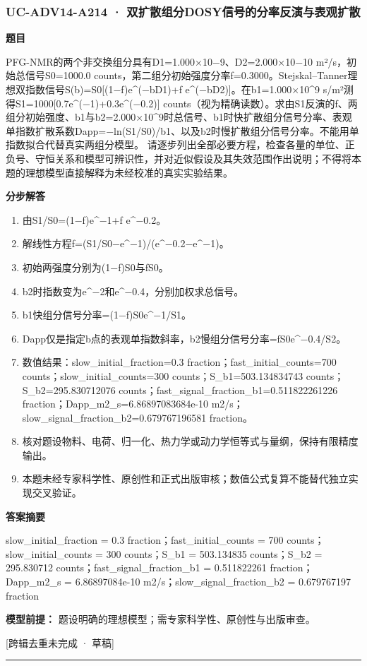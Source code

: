 \documentclass[UTF8,11pt,a4paper]{ctexart}
\begin{document}
\subsubsection*{UC-ADV14-A214 · 双扩散组分DOSY信号的分率反演与表观扩散}
\noindent\textbf{题目}\par
PFG-NMR的两个非交换组分具有D1=1.000×10−9、D2=2.000×10−10 m²/s，初始总信号S0=1000.0 counts，第二组分初始强度分率f=0.3000。Stejskal–Tanner理想双指数信号S(b)=S0[(1−f)e\textasciicircum{}(−bD1)+f e\textasciicircum{}(−bD2)]。在b1=1.000×10\textasciicircum{}9 s/m²测得S1=1000[0.7e\textasciicircum{}(−1)+0.3e\textasciicircum{}(−0.2)] counts（视为精确读数）。求由S1反演的f、两组分初始强度、b1与b2=2.000×10\textasciicircum{}9时总信号、b1时快扩散组分信号分率、表观单指数扩散系数Dapp=−ln(S1/S0)/b1、以及b2时慢扩散组分信号分率。不能用单指数拟合代替真实两组分模型。 请逐步列出全部必要方程，检查各量的单位、正负号、守恒关系和模型可辨识性，并对近似假设及其失效范围作出说明；不得将本题的理想模型直接解释为未经校准的真实实验结果。\par
\medskip\noindent\textbf{分步解答}
\begin{enumerate}
\item 由S1/S0=(1−f)e\textasciicircum{}−1+f e\textasciicircum{}−0.2。
\item 解线性方程f=(S1/S0−e\textasciicircum{}−1)/(e\textasciicircum{}−0.2−e\textasciicircum{}−1)。
\item 初始两强度分别为(1−f)S0与fS0。
\item b2时指数变为e\textasciicircum{}−2和e\textasciicircum{}−0.4，分别加权求总信号。
\item b1快组分信号分率=(1−f)S0e\textasciicircum{}−1/S1。
\item Dapp仅是指定b点的表观单指数斜率，b2慢组分信号分率=fS0e\textasciicircum{}−0.4/S2。
\item 数值结果：slow\_initial\_fraction=0.3 fraction；fast\_initial\_counts=700 counts；slow\_initial\_counts=300 counts；S\_b1=503.134834743 counts；S\_b2=295.830712076 counts；fast\_signal\_fraction\_b1=0.511822261226 fraction；Dapp\_m2\_s=6.86897083684e-10 m2/s；slow\_signal\_fraction\_b2=0.679767196581 fraction。
\item 核对题设物料、电荷、归一化、热力学或动力学恒等式与量纲，保持有限精度输出。
\item 本题未经专家科学性、原创性和正式出版审核；数值公式复算不能替代独立实现交叉验证。
\end{enumerate}
\noindent\textbf{答案摘要}\par
slow\_initial\_fraction = 0.3 fraction；fast\_initial\_counts = 700 counts；slow\_initial\_counts = 300 counts；S\_b1 = 503.134835 counts；S\_b2 = 295.830712 counts；fast\_signal\_fraction\_b1 = 0.511822261 fraction；Dapp\_m2\_s = 6.86897084e-10 m2/s；slow\_signal\_fraction\_b2 = 0.679767197 fraction\par
\noindent\textbf{模型前提：}
题设明确的理想模型；需专家科学性、原创性与出版审查。\par
\noindent\textcolor{red!65!black}{[跨辑去重未完成 · 草稿]} \par
\medskip\hrule\medskip
{}
\end{document}
